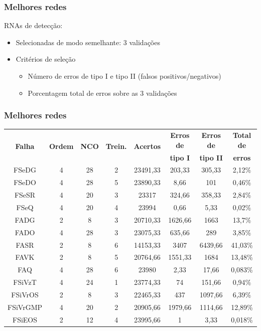 \documentclass{beamer}
\begin{document}
\begin{frame}
    \frametitle{Melhores redes}

RNAs de detecção:

\begin{itemize}
    \item Selecionadas de modo semelhante: 3 validações
    \item Critérios de seleção
    \begin{itemize}
        \item Número de erros de tipo I e tipo II (falsos positivos/negativos)
        \item Porcentagem total de erros sobre as 3 validações
    \end{itemize}
\end{itemize}
\end{frame}

\begin{frame}
    \frametitle{Melhores redes}

\begin{table}[htb]
\scriptsize
\begin{tabular}{|c|c|c|c|c|c|c|c|}
\hline
\multirow{2}{*}{\bf Falha} &
\multirow{2}{*}{\bf Ordem} &
\multirow{2}{*}{\bf NCO} &
\multirow{2}{*}{\bf Trein.} &
\multirow{2}{*}{\bf Acertos} &
{\bf Erros de} & {\bf Erros de} & {\bf Total de}\\
& & & & & {\bf tipo I} & {\bf tipo II} & {\bf erros}\\
\hline
\hline
FSeDG & 4 & 28 & 2 & 23491,33 & 203,33 & 305,33 & 2,12\%\\
\hline
FSeDO & 4 & 28 & 5 & 23890,33 & 8,66 & 101 & 0,46\%\\
\hline
FSeSR & 4 & 20 & 3 & 23317 & 324,66 & 358,33 & 2,84\%\\
\hline
FSeQ & 4 & 20 & 4 & 23994 & 0,66 & 5,33 & 0,02\%\\
\hline
FADG & 2 & 8 & 3 & 20710,33 & 1626,66 & 1663 & 13,7\%\\
\hline
FADO & 4 & 28 & 3 & 23075,33 & 635,66 & 289 & 3,85\%\\
\hline
\alert<2->{FASR} & 2 & 8 & 6 & 14153,33 & 3407 & 6439,66 & \alert<2->{41,03\%}\\
\hline
FAVK & 2 & 8 & 5 & 20764,66 & 1551,33 & 1684 & 13,48\%\\
\hline
FAQ & 4 & 28 & 6 & 23980 & 2,33 & 17,66 & 0,083\%\\
\hline
FSiVzT & 4 & 24 & 1 & 23774,33 & 74 & 151,66 & 0,94\%\\
\hline
FSiVrOS & 2 & 8 & 3 & 22465,33 & 437 & 1097,66 & 6,39\%\\
\hline
FSiVrGMP & 4 & 20 & 2 & 20905,66 & 1979,66 & 1114,66 & 12,89\%\\
\hline
\alert<2->{FSiEOS} & 2 & 12 & 4 & 23995,66 & 1 & 3,33 & \alert<2->{0,018\%}\\
\hline
\end{tabular}
\end{table}
\end{frame}
\end{document}
